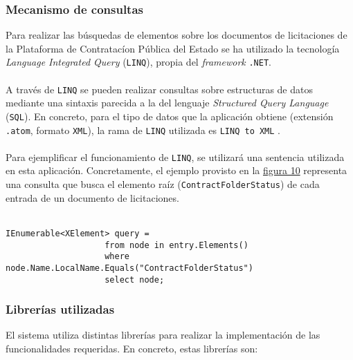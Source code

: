         \subsubsection{Mecanismo de consultas}
            Para realizar las búsquedas de elementos sobre los documentos de licitaciones de la Plataforma de Contratacíon Pública del Estado se ha utilizado la tecnología \textit{Language Integrated Query} (\texttt{LINQ}), propia del \textit{framework} \texttt{.NET}.
            \\ \\
            A través de \texttt{LINQ} se pueden realizar consultas sobre estructuras de datos mediante una sintaxis parecida a la del lenguaje \textit{Structured Query Language} (\texttt{SQL}). En concreto, para el tipo de datos que la aplicación obtiene (extensión \texttt{.atom}, formato \texttt{XML}), la rama de \texttt{LINQ} utilizada es \texttt{LINQ to XML} \cite{LINQXML}.
            \\ \\
            Para ejemplificar el funcionamiento de \texttt{LINQ}, se utilizará una sentencia utilizada en esta aplicación. Concretamente, el ejemplo provisto en la \hyperref[fig:linq]{figura 10} representa una consulta que busca el elemento raíz (\texttt{ContractFolderStatus}) de cada entrada de un documento de licitaciones.
            \\ \\
            \begin{lstlisting}[language=lCSharp,gobble=14]
                IEnumerable<XElement> query =
                    from node in entry.Elements()
                    where node.Name.LocalName.Equals("ContractFolderStatus")
                    select node;
            \end{lstlisting}
            \label{fig:linq}
        
        \subsubsection{Librerías utilizadas} \label{subsubsec:libreria}
            El sistema utiliza distintas librerías para realizar la implementación de las funcionalidades requeridas. En concreto, estas librerías son:
            
